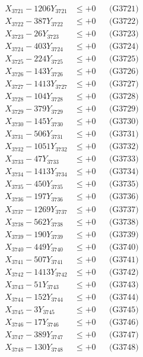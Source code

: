 \documentclass[a4paper,10pt]{article}
\begin{document}
{\begin{align}
\allowbreak
X_{3721} - 1206Y_{3721} &\leq +0 && \text{(G3721)} \\
X_{3722} - 387Y_{3722} &\leq +0 && \text{(G3722)} \\
X_{3723} - 26Y_{3723} &\leq +0 && \text{(G3723)} \\
X_{3724} - 403Y_{3724} &\leq +0 && \text{(G3724)} \\
X_{3725} - 224Y_{3725} &\leq +0 && \text{(G3725)} \\
X_{3726} - 143Y_{3726} &\leq +0 && \text{(G3726)} \\
X_{3727} - 1413Y_{3727} &\leq +0 && \text{(G3727)} \\
X_{3728} - 104Y_{3728} &\leq +0 && \text{(G3728)} \\
X_{3729} - 379Y_{3729} &\leq +0 && \text{(G3729)} \\
X_{3730} - 145Y_{3730} &\leq +0 && \text{(G3730)} \\
\allowbreak
X_{3731} - 506Y_{3731} &\leq +0 && \text{(G3731)} \\
X_{3732} - 1051Y_{3732} &\leq +0 && \text{(G3732)} \\
X_{3733} - 47Y_{3733} &\leq +0 && \text{(G3733)} \\
X_{3734} - 1413Y_{3734} &\leq +0 && \text{(G3734)} \\
X_{3735} - 450Y_{3735} &\leq +0 && \text{(G3735)} \\
X_{3736} - 197Y_{3736} &\leq +0 && \text{(G3736)} \\
X_{3737} - 1269Y_{3737} &\leq +0 && \text{(G3737)} \\
X_{3738} - 562Y_{3738} &\leq +0 && \text{(G3738)} \\
X_{3739} - 190Y_{3739} &\leq +0 && \text{(G3739)} \\
X_{3740} - 449Y_{3740} &\leq +0 && \text{(G3740)} \\
\allowbreak
X_{3741} - 507Y_{3741} &\leq +0 && \text{(G3741)} \\
X_{3742} - 1413Y_{3742} &\leq +0 && \text{(G3742)} \\
X_{3743} - 51Y_{3743} &\leq +0 && \text{(G3743)} \\
X_{3744} - 152Y_{3744} &\leq +0 && \text{(G3744)} \\
X_{3745} - 3Y_{3745} &\leq +0 && \text{(G3745)} \\
X_{3746} - 17Y_{3746} &\leq +0 && \text{(G3746)} \\
X_{3747} - 389Y_{3747} &\leq +0 && \text{(G3747)} \\
X_{3748} - 130Y_{3748} &\leq +0 && \text{(G3748)} \\

\end{align}}
\end{document}
